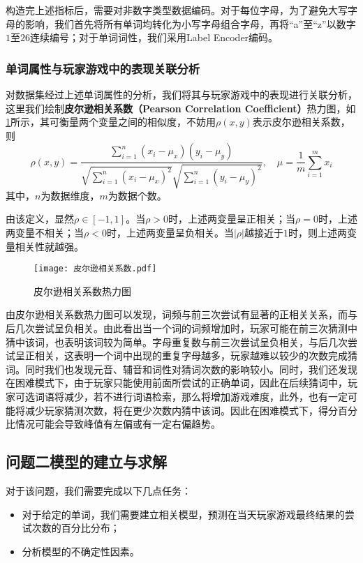 \documentclass{MathModeling}
\begin{document}
	构造完上述指标后，需要对非数字类型数据编码。对于每位字母，为了避免大写字母的影响，我们首先将所有单词均转化为小写字母组合字母，再将“a”至“z”以数字$1$至$26$连续编号；对于单词词性，我们采用Label Encoder编码。
	\subsubsection{单词属性与玩家游戏中的表现关联分析}\label{单词属性与玩家游戏中的表现关联分析}
	对数据集经过上述单词属性的分析，我们将其与玩家游戏中的表现进行关联分析，这里我们绘制\textbf{皮尔逊相关系数（Pearson Correlation Coefficient）}热力图，如\textcolor{blue}{\cref{fig:皮尔逊相关系数热力图}}所示，其可衡量两个变量之间的相似度\textcolor{blue}{\cite{ppearson1}}，不妨用$\rho\left(x,y\right)$表示皮尔逊相关系数，则
	\begin{equation}
	\rho\left(x,y\right)=\frac{\sum\limits_{i=1}^{n}\left(x_{i}-\mu_x\right)\left(y_{i}-\mu_y\right)}{\sqrt{\sum\limits_{i=1}^{n}\left(x_{i}-\mu_x\right)^{2}}\sqrt{\sum\limits_{i=1}^{n}\left(y_{i}-\mu_y\right)^{2}}},\quad\mu=\frac{1}{m}\sum_{i=1}^{m}x_i \label{fpearson}
	\end{equation}
	其中，$n$为数据维度，$m$为数据个数。
	
	由该定义，显然$\rho\in[-1,1]$。当$\rho>0$时，上述两变量呈正相关；当$\rho=0$时，上述两变量不相关；当$\rho<0$时，上述两变量呈负相关。当$\left|\rho\right|$越接近于$1$时，则上述两变量相关性就越强\textcolor{blue}{\cite{ppearson2}}。
	\begin{figure}[H]
		\centering
		\texttt{[image: 皮尔逊相关系数.pdf]}
		\caption{皮尔逊相关系数热力图}
		\label{fig:皮尔逊相关系数热力图}
	\end{figure}

	由皮尔逊相关系数热力图可以发现，词频与前三次尝试有显著的正相关关系，而与后几次尝试呈负相关。由此看出当一个词的词频增加时，玩家可能在前三次猜测中猜中该词，也表明该词较为简单。字母重复数与前三次尝试呈负相关，与后几次尝试呈正相关，这表明一个词中出现的重复字母越多，玩家越难以较少的次数完成猜词。同时我们也发现元音、辅音和词性对猜词次数的影响较小。同时，我们还发现在困难模式下，由于玩家只能使用前面所尝试的正确单词，因此在后续猜词中，玩家可选词语将减少，若不进行词语检索，那么将增加游戏难度，此外，也有一定可能将减少玩家猜测次数，将在更少次数内猜中该词。因此在困难模式下，得分百分比情况可能会导致峰值有左偏或有一定右偏趋势。

	\subsection{问题二模型的建立与求解}
	对于该问题，我们需要完成以下几点任务：
	\begin{itemize}
		\item 对于给定的单词，我们需要建立相关模型，预测在当天玩家游戏最终结果的尝试次数的百分比分布；
		\item 分析模型的不确定性因素。
	\end{itemize}
	
\end{document}
